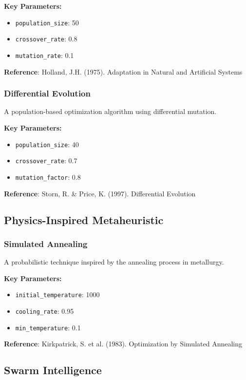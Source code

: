 \documentclass[11pt,a4paper]{article}
\begin{document}
\textbf{Key Parameters:}
\begin{itemize}
    \item \texttt{population_size}: 50
    \item \texttt{crossover_rate}: 0.8
    \item \texttt{mutation_rate}: 0.1
\end{itemize}

\textbf{Reference}: Holland, J.H. (1975). Adaptation in Natural and Artificial Systems

\subsubsection{Differential Evolution}

A population-based optimization algorithm using differential mutation.

\textbf{Key Parameters:}
\begin{itemize}
    \item \texttt{population_size}: 40
    \item \texttt{crossover_rate}: 0.7
    \item \texttt{mutation_factor}: 0.8
\end{itemize}

\textbf{Reference}: Storn, R. & Price, K. (1997). Differential Evolution

\subsection{Physics-Inspired Metaheuristic}

\subsubsection{Simulated Annealing}

A probabilistic technique inspired by the annealing process in metallurgy.

\textbf{Key Parameters:}
\begin{itemize}
    \item \texttt{initial_temperature}: 1000
    \item \texttt{cooling_rate}: 0.95
    \item \texttt{min_temperature}: 0.1
\end{itemize}

\textbf{Reference}: Kirkpatrick, S. et al. (1983). Optimization by Simulated Annealing

\subsection{Swarm Intelligence}
\end{document}
